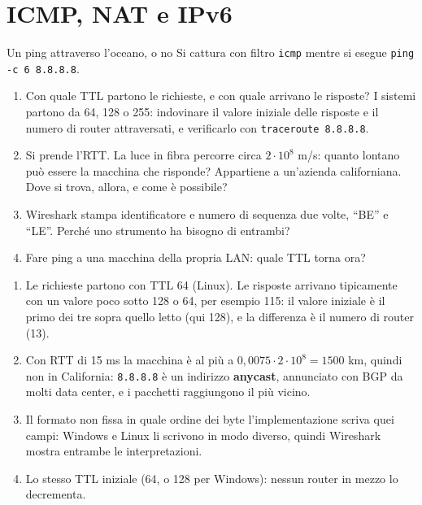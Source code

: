 \section{ICMP, NAT e IPv6}

\begin{esercizio}{Un ping attraverso l'oceano, o no}
Si cattura con filtro \texttt{icmp} mentre si esegue \texttt{ping -c 6 8.8.8.8}.
\begin{enumerate}[label=(\alph*)]
    \item Con quale TTL partono le richieste, e con quale arrivano le risposte? I sistemi partono da 64, 128 o 255: indovinare il valore
          iniziale delle risposte e il numero di router attraversati, e verificarlo con \texttt{traceroute 8.8.8.8}.
    \item Si prende l'RTT. La luce in fibra percorre circa $2 \cdot 10^8$ m/s: quanto lontano può essere la macchina che risponde? Appartiene
          a un'azienda californiana. Dove si trova, allora, e come è possibile?
    \item Wireshark stampa identificatore e numero di sequenza due volte, ``BE'' e ``LE''. Perché uno strumento ha bisogno di entrambi?
    \item Fare ping a una macchina della propria LAN: quale TTL torna ora?
\end{enumerate}

\svolgimento
\begin{enumerate}[label=(\alph*)]
    \item Le richieste partono con TTL 64 (Linux). Le risposte arrivano tipicamente con un valore poco sotto 128 o 64, per esempio 115: il
          valore iniziale è il primo dei tre sopra quello letto (qui 128), e la differenza è il numero di router (13).
    \item Con RTT di 15 ms la macchina è al più a $0{,}0075 \cdot 2 \cdot 10^8 = 1500$ km, quindi non in California: \texttt{8.8.8.8} è un
          indirizzo \textbf{anycast}, annunciato con BGP da molti data center, e i pacchetti raggiungono il più vicino.
    \item Il formato non fissa in quale ordine dei byte l'implementazione scriva quei campi: Windows e Linux li scrivono in modo diverso,
          quindi Wireshark mostra entrambe le interpretazioni.
    \item Lo stesso TTL iniziale (64, o 128 per Windows): nessun router in mezzo lo decrementa.
\end{enumerate}
\end{esercizio}

